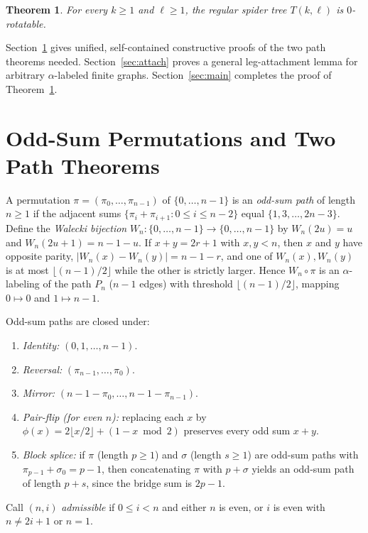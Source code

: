\documentclass[11pt]{article}
\newtheorem{theorem}{Theorem}[section]
\begin{document}
\begin{theorem}\label{thm:main}
For every $k \ge 1$ and $\ell \ge 1$, the regular spider tree $T(k, \ell)$ is $0$-rotatable.
\end{theorem}

Section~\ref{sec:paths} gives unified, self-contained constructive proofs of the two path theorems needed. Section~\ref{sec:attach} proves a general leg-attachment lemma for arbitrary $\alpha$-labeled finite graphs. Section~\ref{sec:main} completes the proof of Theorem~\ref{thm:main}.

\section{Odd-Sum Permutations and Two Path Theorems}\label{sec:paths}

A permutation $\pi = (\pi_0, \dots, \pi_{n-1})$ of $\{0, \dots, n - 1\}$ is an \emph{odd-sum path} of length $n \ge 1$ if the adjacent sums $\{\pi_i + \pi_{i+1} : 0 \le i \le n - 2\}$ equal $\{1, 3, \dots, 2n - 3\}$. Define the \emph{Walecki bijection} $W_n : \{0, \dots, n - 1\} \to \{0, \dots, n - 1\}$ by $W_n(2u) = u$ and $W_n(2u + 1) = n - 1 - u$. If $x + y = 2r + 1$ with $x, y < n$, then $x$ and $y$ have opposite parity, $|W_n(x) - W_n(y)| = n - 1 - r$, and one of $W_n(x), W_n(y)$ is at most $\lfloor (n - 1)/2 \rfloor$ while the other is strictly larger. Hence $W_n \circ \pi$ is an $\alpha$-labeling of the path $P_n$ ($n - 1$ edges) with threshold $\lfloor (n - 1)/2 \rfloor$, mapping $0 \mapsto 0$ and $1 \mapsto n - 1$.

Odd-sum paths are closed under:
\begin{enumerate}
\item \emph{Identity:} $(0, 1, \dots, n - 1)$.
\item \emph{Reversal:} $(\pi_{n-1}, \dots, \pi_0)$.
\item \emph{Mirror:} $(n - 1 - \pi_0, \dots, n - 1 - \pi_{n-1})$.
\item \emph{Pair-flip (for even $n$):} replacing each $x$ by $\phi(x) = 2\lfloor x/2 \rfloor + (1 - x \bmod 2)$ preserves every odd sum $x + y$.
\item \emph{Block splice:} if $\pi$ (length $p \ge 1$) and $\sigma$ (length $s \ge 1$) are odd-sum paths with $\pi_{p-1} + \sigma_0 = p - 1$, then concatenating $\pi$ with $p + \sigma$ yields an odd-sum path of length $p + s$, since the bridge sum is $2p - 1$.
\end{enumerate}

Call $(n, i)$ \emph{admissible} if $0 \le i < n$ and either $n$ is even, or $i$ is even with $n \ne 2i + 1$ or $n = 1$.
\end{document}
